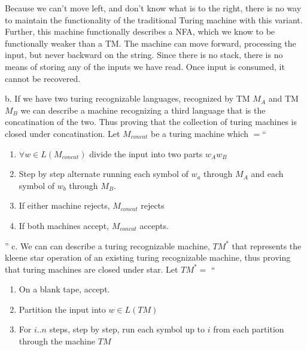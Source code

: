 \begin{problem}{7}
  \begin{solution}
    Because we can't move left, and don't know what is to the right, there is no way to maintain the functionality of
    the traditional Turing machine with this variant.  Further, this machine functionally describes a NFA, which we know
    to be functionally weaker than a TM. The machine can move forward, processing the input, but never backward on the
    string. Since there is no stack, there is no means of storing any of the inputs we have read. Once input is
    consumed, it cannot be recovered.
  \end{solution}
\end{problem}

\begin{problem}{8}
  \begin{solution}
    b. If we have two turing recognizable languages, recognized by TM $M_A$ and TM $M_B$ we can describe a machine
       recognizing a third language that is the concatination of the two. Thus proving that the collection of turing
       machines is closed under concatination.
    \br
    Let $M_{concat}$ be a turing machine which $=$``
      \begin{enumerate}
        \item  $\forall w \in L(M_{concat})$ divide the input into two parts $w_Aw_B$ \\
        \item Step by step alternate running each symbol of $w_a$ through $M_A$ and each symbol of $w_b$ through $M_B$. \\
        \item If either machine rejects, $M_{concat}$ rejects \\
        \item If both machines accept, $M_{concat}$ accepts.
      \end{enumerate}
    ''
    \br
    c. We can can describe a turing recognizable machine, $TM^*$ that represents the kleene star operation of an
       existing turing recognizable machine, thus proving that turing machines are closed under star.
    \br
    Let $TM^* =$ ``
      \begin{enumerate}
        \item On a blank tape, accept. \\
        \item Partition the input into $w \in L(TM)$ \\
        \item For $i..n$ steps, step by step, run each symbol up to $i$ from each partition through the machine $TM$ \\

\end{enumerate}
\end{solution}
\end{problem}
